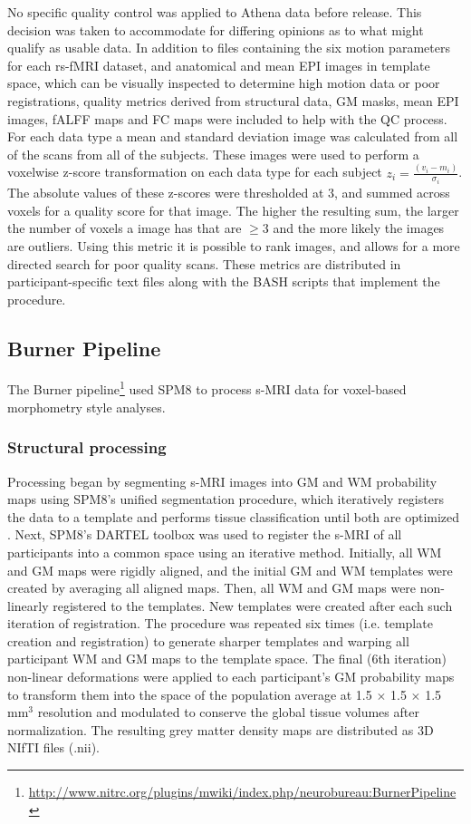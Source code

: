 \documentclass[preprint,12pt,3p]{elsarticle}
\begin{document}
No specific quality control was applied to Athena data before release. This decision was taken to accommodate for differing opinions as to what might qualify as usable data. In addition to files containing the six motion parameters for each rs-fMRI dataset, and anatomical and mean EPI images in template space, which can be visually inspected to determine high motion data or poor registrations, quality metrics derived from structural data, GM masks, mean EPI images, fALFF maps and FC maps were included to help with the QC process. %
For each data type a mean and standard deviation image was calculated from all of the scans from all of the subjects. These images were used to perform a voxelwise z-score transformation on each data type for each subject $z_i = \frac{(v_i-m_i)}{\sigma_i}$. The absolute values of these z-scores were thresholded at 3, and summed across voxels for a quality score for that image. The higher the resulting sum, the larger the number of voxels a image has that are $\geq 3$ and the more likely the images are outliers. Using this metric it is possible to rank images, and allows for a more directed search for poor quality scans. These metrics are distributed in participant-specific text files along with the BASH scripts that implement the procedure.

\subsection{Burner Pipeline}

The Burner pipeline\footnote{\url{http://www.nitrc.org/plugins/mwiki/index.php/neurobureau:BurnerPipeline}} used SPM8 \cite{ashburner2012spm8} to process s-MRI data for voxel-based morphometry \cite{ashburner2000vbm} style analyses.

\subsubsection{Structural processing} 
Processing began by segmenting s-MRI images into GM and WM probability maps using SPM8's unified segmentation procedure, which iteratively registers the data to a template and performs tissue classification until both are optimized \cite{ashburner2005unified}. Next, SPM8's DARTEL toolbox \cite{ashburner2007dartel} was used to register the s-MRI of all participants into a common space using an iterative method. Initially, all WM and GM maps were rigidly aligned, and the initial GM and WM templates were created by averaging all aligned maps. Then, all WM and GM maps were non-linearly registered to the templates. New templates were created after each such iteration of registration. The procedure was repeated six times (i.e. template creation and registration) to generate sharper templates and warping all participant WM and GM maps to the template space. The final (6th iteration) non-linear deformations were applied to each participant's GM probability maps to transform them into the space of the population average at 1.5 $\times$ 1.5 $\times$ 1.5 mm$^3$ resolution and modulated to conserve the global tissue volumes after normalization. The resulting grey matter density maps are distributed as 3D NIfTI files (.nii).
\end{document}
